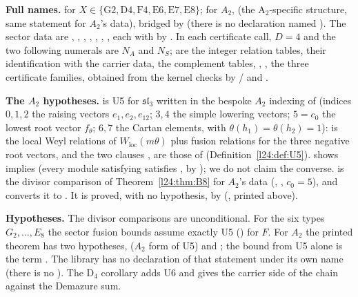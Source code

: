 \begin{dictionary}
\textbf{Full names.}  for
$X\in\{\mathrm{G2},\mathrm{D4},\mathrm{F4},\mathrm{E6},\mathrm{E7},\mathrm{E8}\}$; for $A_2$,
 (the A$_2$-specific structure, same statement
for $A_2$'s data), bridged by  (there is no declaration named
). The sector data are , ,
, , , , , each with
 by . In each certificate call, $D=4$ and the two following
numerals are $N_A$ and $N_S$;  are the integer relation tables,  their identification with the
carrier data,  the complement tables, , ,  the three certificate families,
obtained from the kernel checks by / and .

\textbf{The $A_2$ hypotheses.}  is U5 for $\mathfrak{sl}_3$ written in the
bespoke $A_2$ indexing of  (indices $0,1,2$ the raising vectors $e_1,e_2,e_{12}$; $3,4$ the
simple lowering vectors; $5=c_0$ the lowest root vector $f_\theta$; $6,7$ the Cartan elements, with $\theta(h_1)=\theta(h_2)=1$):
 is the local Weyl relations of $W_{\mathrm{loc}}(m\theta)$ plus fusion relations for the three
negative root vectors, and the two clauses ,  are those of 
(Definition~\ref{l24:def:U5}).  shows  implies
 (every module satisfying  satisfies
, by ); we do not claim the converse.  is the
divisor comparison of Theorem~\ref{l24:thm:B8} for $A_2$'s data (, , $c_0=5$),
and  converts it to . It is proved, with no hypothesis, by
 (, printed above).

\textbf{Hypotheses.} The divisor comparisons are unconditional. For the six types $G_2,\dots,E_8$ the sector fusion
bounds  assume exactly U5 () for $F$. For $A_2$ the
printed theorem  has two hypotheses,  ($A_2$ form of
U5) and ; the bound from U5 alone is the term
. The library has no declaration of that statement under
its own name (there is no ).
The D$_4$ corollary adds U6 and gives the carrier side of the chain against the Demazure sum.
\end{dictionary}

